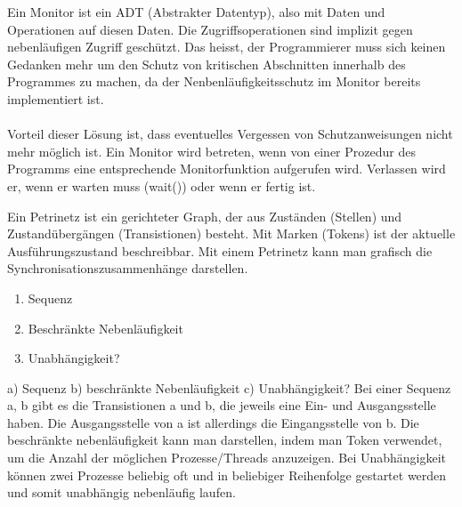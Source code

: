 \begin{answer}
Ein Monitor ist ein ADT (Abstrakter Datentyp), also mit Daten und Operationen auf diesen Daten. Die Zugriffsoperationen sind implizit gegen nebenläufigen Zugriff geschützt. Das heisst, der Programmierer muss sich keinen Gedanken mehr um den Schutz von kritischen Abschnitten innerhalb des Programmes zu machen, da der Nenbenläufigkeitsschutz im Monitor bereits implementiert
ist.

\paragraph*{}
Vorteil dieser Lösung ist, dass eventuelles Vergessen von Schutzanweisungen nicht mehr möglich ist. Ein Monitor wird betreten, wenn von einer Prozedur des Programms eine entsprechende Monitorfunktion aufgerufen wird. Verlassen wird er, wenn er warten muss (wait()) oder wenn er fertig ist.
\end{answer}

\begin{answer}
Ein Petrinetz ist ein gerichteter Graph, der aus Zuständen (Stellen) und Zustandübergängen
(Transistionen) besteht. Mit Marken (Tokens) ist der aktuelle Ausführungszustand beschreibbar.
Mit einem Petrinetz kann man grafisch die Synchronisationszusammenhänge darstellen.
\end{answer}

\begin{multilinequestion}
\begin{enumerate}
\item Sequenz
\item Beschränkte Nebenläufigkeit
\item Unabhängigkeit?
\end{enumerate}
\end{multilinequestion}
\begin{answer}
a) Sequenz
b) beschränkte Nebenläufigkeit
c) Unabhängigkeit?
Bei einer Sequenz a, b gibt es die Transistionen a und b, die jeweils eine Ein- und Ausgangsstelle
haben. Die Ausgangsstelle von a ist allerdings die Eingangsstelle von b.
Die beschränkte nebenläufigkeit kann man darstellen, indem man Token verwendet, um die Anzahl
der möglichen Prozesse/Threads anzuzeigen.
Bei Unabhängigkeit können zwei Prozesse beliebig oft und in beliebiger Reihenfolge gestartet
werden und somit unabhängig nebenläufig laufen.
\end{answer}

